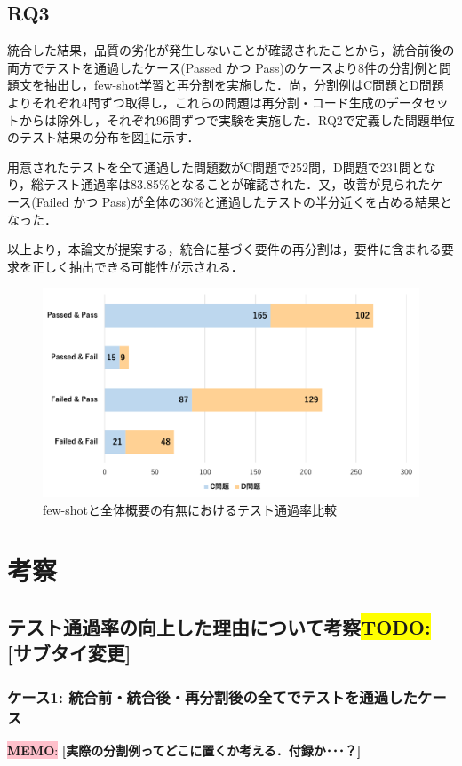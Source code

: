 \documentclass[submit,techrep,noauthor]{ipsj}
\newcommand{\todo}[1]{\colorbox{yellow}{{\bf TODO}:}{\color{red} {\textbf{[#1]}}}}
\newcommand{\memo}[1]{\colorbox{pink}{{\bf MEMO}:}{\color{black} {\textbf{[#1]}}}}
\begin{document}
\subsection{RQ3}
統合した結果，品質の劣化が発生しないことが確認されたことから，統合前後の両方でテストを通過したケース(Passed かつ Pass)のケースより8件の分割例と問題文を抽出し，few-shot学習と再分割を実施した．尚，分割例はC問題とD問題よりそれぞれ4問ずつ取得し，これらの問題は再分割・コード生成のデータセットからは除外し，それぞれ96問ずつで実験を実施した．RQ2で定義した問題単位のテスト結果の分布を図\ref{rq3_1}に示す．

用意されたテストを全て通過した問題数がC問題で252問，D問題で231問となり，総テスト通過率は83.85\%となることが確認された．又，改善が見られたケース(Failed かつ Pass)が全体の36\%と通過したテストの半分近くを占める結果となった．

以上より，本論文が提案する，統合に基づく要件の再分割は，要件に含まれる要求を正しく抽出できる可能性が示される．

\begin{figure}[t]
    \centering
    \includegraphics[width=1.0\linewidth]{./Toyoshima_fig/RQ3_1.pdf}
    \caption{few-shotと全体概要の有無におけるテスト通過率比較\protect\footnotemark}
    \label{rq3_1}
\end{figure}

\section{考察}
\label{sec:discussion}
\subsection{テスト通過率の向上した理由について考察\todo{サブタイ変更}}
\subsubsection{ケース1: 統合前・統合後・再分割後の全てでテストを通過したケース}
\memo{実際の分割例ってどこに置くか考える．付録か･･･？}
\end{document}
